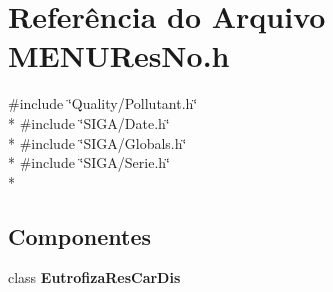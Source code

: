 \section{Referência do Arquivo M\+E\+N\+U\+Res\+No.\+h}
\label{_m_e_n_u_res_no_8h}
{\ttfamily \#include \char`\"{}Quality/\+Pollutant.\+h\char`\"{}}\\*
{\ttfamily \#include \char`\"{}S\+I\+G\+A/\+Date.\+h\char`\"{}}\\*
{\ttfamily \#include \char`\"{}S\+I\+G\+A/\+Globals.\+h\char`\"{}}\\*
{\ttfamily \#include \char`\"{}S\+I\+G\+A/\+Serie.\+h\char`\"{}}\\*
\subsection*{Componentes}
\begin{DoxyCompactItemize}
\item 
class {\bf Eutrofiza\+Res\+Car\+Dis}
\end{DoxyCompactItemize}
